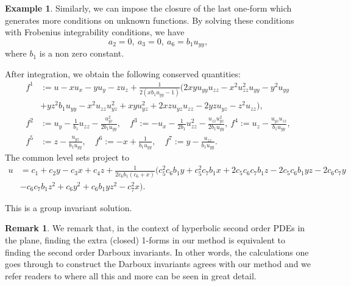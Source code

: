 \documentclass[a4paper, 11pt]{amsart}
\theoremstyle{definition}
\newtheorem{example}[theorem]{Example}
\newtheorem{remark}[theorem]{Remark}
\begin{document}
\begin{example}
Similarly, we can impose the closure of the last one-form which generates more conditions on unknown functions.
By solving these conditions with Frobenius integrability conditions, we have
\[a_2=0,~a_3=0,~a_6=b_1u_{yy},\] where $b_1$ is a non zero constant.

After integration, we obtain the following conserved quantities:
\begin{align*}
f^1&:=u-xu_x-yu_y-zu_z+\frac{1}{2(xb_1u_{yy}-1)}(2xyu_{yy}u_{zz}-x^2u_{zz}^2u_{yy}-y^2u_{yy}\\
&+yz^2b_1u_{yy}-x^2u_{zz}u_{yz}^2+xyu_{yz}^2+2xzu_{yz}u_{zz}-2yzu_{yz}-z^2u_{zz}),\\
f^2&:=u_{y}-\frac{1}{b_1}u_{zz}-\frac{u_{yz}^2}{2b_1u_{yy}},\quad f^3:=-u_x-\frac{1}{2b_1}u_{zz}^2-\frac{u_{zz}u_{yz}^2}{2b_1u_{yy}},~f^4:=u_z-\frac{u_{yz}u_{zz}}{b_1u_{yy}},\\
f^5&:=z-\frac{u_{yz}}{b_1u_{yy}},\quad f^6:=-x+\frac{1}{ b_1u_{yy}},\quad f^7:=y-\frac{u_{zz}}{b_1u_{yy}}.
\end{align*}
The common level sets project to
 \begin{align*}
 u&=c_1+c_2y-c_3x+c_4z+ \frac{1}{2c_6b_1(c_6 + x)}(c_5^2 c_6b_1y + c_5^2 c_7b_1x + 2c_5c_6c_7b_1z - 2c_5c_6b_1yz - 2c_6c_7y\\
 &- c_6c_7b_1z^2+ c_6y^2  + c_6b_1yz^2 - c_7^2 x).
\end{align*}
\end{example}
This is a group invariant solution.
\begin{remark}
We remark that, in the context of hyperbolic second order PDEs in the plane, finding the extra (closed) 1-forms in our method is equivalent
to finding the second order Darboux invariants. In other words, the calculations one goes through to construct the Darboux invariants agrees with our method and we refer readers to \cite{Goursat} where all this and more can be seen in great detail.
\end{remark}
\end{document}
